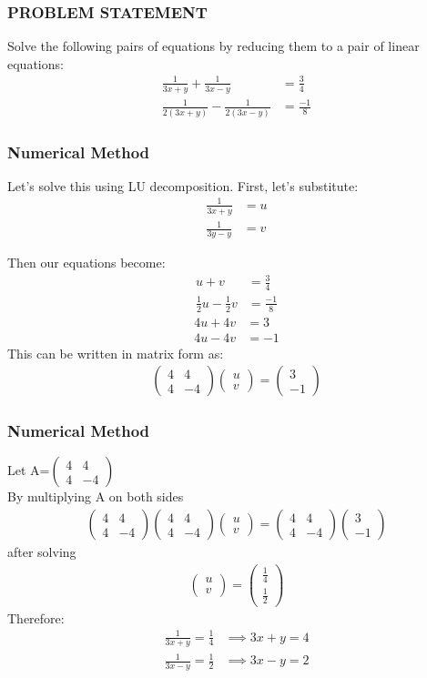 \documentclass{beamer}
\providecommand{\brak}[1]{\ensuremath{\left(#1\right)}}
\theoremstyle{remark}
\newcommand{\myvec}[1]{\ensuremath{\begin{pmatrix}#1\end{pmatrix}}}
\numberwithin{equation}{section}
\begin{document}
\begin{frame}
   \frametitle{PROBLEM STATEMENT}
Solve the following pairs of equations by reducing them to a pair of linear equations:
\begin{align*}
    \frac{1}{3x+y} + \frac{1}{3x-y} &= \frac{3}{4}\\
    \frac{1}{2\brak{3x+y}} - \frac{1}{2\brak{3x-y}} &= \frac{-1}{8}
\end{align*}
\end{frame}
\begin{frame}
\frametitle{Numerical Method}
 Let's solve this using LU decomposition. First, let's substitute:
\begin{align}
    \frac{1}{3x+y} &= u\\
    \frac{1}{3y-y} &= v
\end{align}

Then our equations become:
\begin{align}
    u + v &= \frac{3}{4} \label{eq1}\\
    \frac{1}{2}u - \frac{1}{2}v &= \frac{-1}{8} \label{eq2}
\end{align}
\begin{align}
    4u + 4v &= 3 \label{eq1}\\
    4u - 4v &= -1 \label{eq2}
\end{align}
This can be written in matrix form as:
\begin{align}
    \myvec{4 & 4 \\ 4& -4}\myvec{u\\v} = \myvec{3\\-1}
\end{align}
\end{frame}
\begin{frame}
\frametitle{Numerical Method}
 Let A=$\myvec{4 & 4 \\ 4& -4}$\\
By multiplying A on both sides\\
\begin{align}
    \myvec{4 & 4 \\ 4& -4}\myvec{4 & 4 \\ 4& -4}\myvec{u\\v} = \myvec{4 & 4 \\ 4& -4}\myvec{3\\-1}
\end{align}
after solving 
\begin{align}
    \myvec{u\\v}=\myvec{\frac{1}{4}\\ \frac{1}{2}}
\end{align}
Therefore:
\begin{align}
    \frac{1}{3x+y} =\frac{1}{4} &\implies 3x+y=4\\
    \frac{1}{3x-y} = \frac{1}{2} &\implies 3x-y =2\\
\end{align}

\end{frame}
\end{document}

